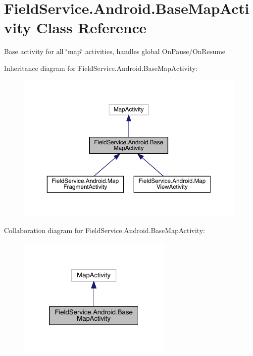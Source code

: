 \hypertarget{class_field_service_1_1_android_1_1_base_map_activity}{\section{Field\+Service.\+Android.\+Base\+Map\+Activity Class Reference}
\label{class_field_service_1_1_android_1_1_base_map_activity}
}


Base activity for all \char`\"{}map\char`\"{} activities, handles global On\+Pause/\+On\+Resume  




Inheritance diagram for Field\+Service.\+Android.\+Base\+Map\+Activity\+:
\nopagebreak
\begin{figure}[H]
\begin{center}
\leavevmode
\includegraphics[width=350pt]{class_field_service_1_1_android_1_1_base_map_activity__inherit__graph}
\end{center}
\end{figure}


Collaboration diagram for Field\+Service.\+Android.\+Base\+Map\+Activity\+:
\nopagebreak
\begin{figure}[H]
\begin{center}
\leavevmode
\includegraphics[width=212pt]{class_field_service_1_1_android_1_1_base_map_activity__coll__graph}
\end{center}
\end{figure}
